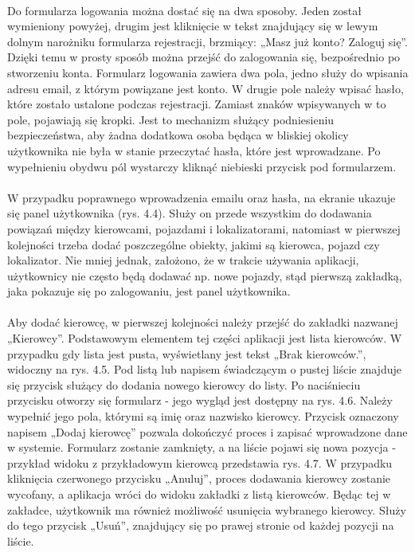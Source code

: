\paragraph{}
Do formularza logowania można dostać się na dwa sposoby. Jeden został wymieniony powyżej, drugim jest kliknięcie w tekst znajdujący się w lewym dolnym narożniku formularza rejestracji, brzmiący: „Masz już konto? Zaloguj się”. Dzięki temu w prosty sposób można przejść do zalogowania się, bezpośrednio po stworzeniu konta. Formularz logowania zawiera dwa pola, jedno służy do wpisania adresu email, z którym powiązane jest konto. W drugie pole należy wpisać hasło, które zostało ustalone podczas rejestracji. Zamiast znaków wpisywanych w to pole, pojawiają się kropki. Jest to mechanizm służący podniesieniu bezpieczeństwa, aby żadna dodatkowa osoba będąca w bliskiej okolicy użytkownika nie była w stanie przeczytać hasła, które jest wprowadzane. Po wypełnieniu obydwu pól wystarczy kliknąć niebieski przycisk pod formularzem.

\paragraph{}
W przypadku poprawnego wprowadzenia emailu oraz hasła, na ekranie ukazuje się panel użytkownika (rys. 4.4). Służy on przede wszystkim do dodawania powiązań między kierowcami, pojazdami i lokalizatorami, natomiast w pierwszej kolejności trzeba dodać poszczególne obiekty, jakimi są kierowca, pojazd czy lokalizator. Nie mniej jednak, założono, że w trakcie używania aplikacji, użytkownicy nie często będą dodawać np. nowe pojazdy, stąd pierwszą zakładką, jaka pokazuje się po zalogowaniu, jest panel użytkownika. 

\paragraph{}
Aby dodać kierowcę, w pierwszej kolejności należy przejść do zakładki nazwanej „Kierowcy”. Podstawowym elementem tej części aplikacji jest lista kierowców. W przypadku gdy lista jest pusta, wyświetlany jest tekst „Brak kierowców.”, widoczny na rys. 4.5. Pod listą lub napisem świadczącym o pustej liście znajduje się przycisk służący do dodania nowego kierowcy do listy. Po naciśnieciu przycisku otworzy się formularz - jego wygląd jest dostępny na rys. 4.6. Należy wypełnić jego pola, którymi są imię oraz nazwisko kierowcy. Przycisk oznaczony napisem „Dodaj kierowcę” pozwala dokończyć proces i zapisać wprowadzone dane w systemie. Formularz zostanie zamknięty, a na liście pojawi się nowa pozycja - przykład widoku z przykładowym kierowcą przedstawia rys. 4.7. W przypadku kliknięcia czerwonego przycisku „Anuluj”, proces dodawania kierowcy zostanie wycofany, a aplikacja wróci do widoku zakładki z listą kierowców. Będąc tej w zakładce, użytkownik ma również możliwość usunięcia wybranego kierowcy. Służy do tego przycisk „Usuń”, znajdujący się po prawej stronie od każdej pozycji na liście.

